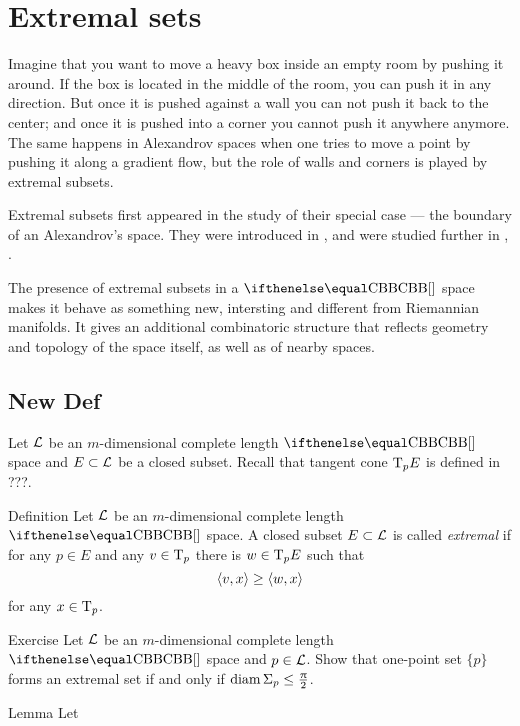 \chapter{Extremal sets}
\label{extremal}

Imagine that you want to move a heavy box inside an empty room by pushing it around. 
If the box is located in the middle of the room, you  can push it in any direction. 
But once it is pushed against a wall you can not push it back to the center;
and once it is pushed into a corner you cannot push it anywhere anymore. 
The same happens in Alexandrov spaces
when one tries to move a point  by pushing it along a gradient flow, 
but the role of walls and corners is played by  extremal subsets.

Extremal subsets first appeared in the study of their special case --- the boundary of
an Alexandrov's space. 
They were introduced in \cite{perelman-petrunin:extremal}, and
were studied further in \cite{petrunin:extremal}, \cite{perelman:collapsing}.

The presence of extremal subsets in a $\Alex{}$ space
makes it behave as something new, 
intersting and
different from Riemannian manifolds.
It gives an additional combinatoric structure that
reflects geometry and topology of the space itself, as well as of nearby spaces.

\section{New Def}

Let $\mathcal{L}$ be an $m$-dimensional complete length $\Alex{}$ space and 
$E\subset \spc{L}$ be a closed subset.
Recall that tangent cone $\text{\rm T}_pE$ is defined in ???.

\begin{thm}{Definition}
Let $\mathcal{L}$ be an $m$-dimensional complete length $\Alex{}$ space.
A closed subset $E\subset \spc{L}$ 
is called \emph{extremal}
if for any $p\in E$ and any $v\in\T_p$ there is $w\in \T_pE$ such that
\[\<v,x\>\ge \<w,x\>\]
for any $x\in \T_p$.
\end{thm}

\begin{thm}{Exercise}
Let $\mathcal{L}$ be an $m$-dimensional complete length $\Alex{}$ space and $p\in \spc{L}$.
Show that one-point set $\{p\}$ forms an extremal set
if and only if $\diam\Sigma_p\le\tfrac\pi2$.
\end{thm}

\begin{thm}{Lemma}
Let 
\end{thm}




